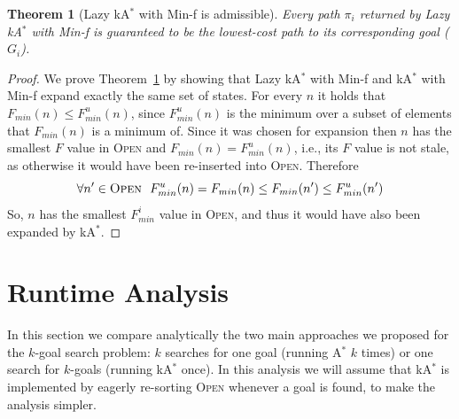 \documentclass{aicom2e}
\newtheorem{theorem}{Theorem}
\newcommand{\kgs}{$k$-goal search}
\newcommand{\astar}{A$^*$}
\newcommand{\kastar}{kA$^*$}
\newcommand{\minf}{Min-f}
\newcommand{\open}{\textsc{Open}}
\begin{document}
\begin{theorem}[Lazy \kastar{} with \minf{} is admissible]
Every path $\pi_i$ returned by Lazy \kastar{} with \minf{} is guaranteed to be the lowest-cost path to its corresponding goal ($G_i$).
\label{the:lazy-minf-correct}
\end{theorem}
\begin{proof}
	We prove Theorem~\ref{the:lazy-minf-correct} by showing that Lazy \kastar{} with \minf{} and \kastar{} with \minf{} expand exactly the same set of states. For every $n$ it holds that $F_{min}(n)\leq F^u_{min}(n)$, since $F^u_{min}(n)$ is the minimum over a subset of elements that $F_{min}(n)$ is a minimum of. 
	Since it was chosen for expansion then $n$ has the smallest $F$ value in \open{}
	and $F_{min}(n)=F^u_{min}(n)$, i.e., its $F$ value is not stale, as otherwise it would have been re-inserted into \open{}. Therefore 
	\[ \forall n'\in\open{} ~~ F^u_{min}(n)=F_{min}(n)\leq F_{min}(n') \leq F^u_{min}(n') \]
	So, $n$ has the smallest $F^i_{min}$ value in \open{}, and thus it would have also been expanded by \kastar{}. 
\end{proof}

	





\section{Runtime Analysis}
In this section we compare analytically the two main approaches we proposed for the \kgs{} problem: $k$ searches for one goal (running \astar{} $k$ times) or one search for $k$-goals (running \kastar{} once). 
In this analysis we will assume that \kastar{} is implemented by eagerly re-sorting \open{} whenever a goal is found, to make the analysis simpler. 
\end{document}
